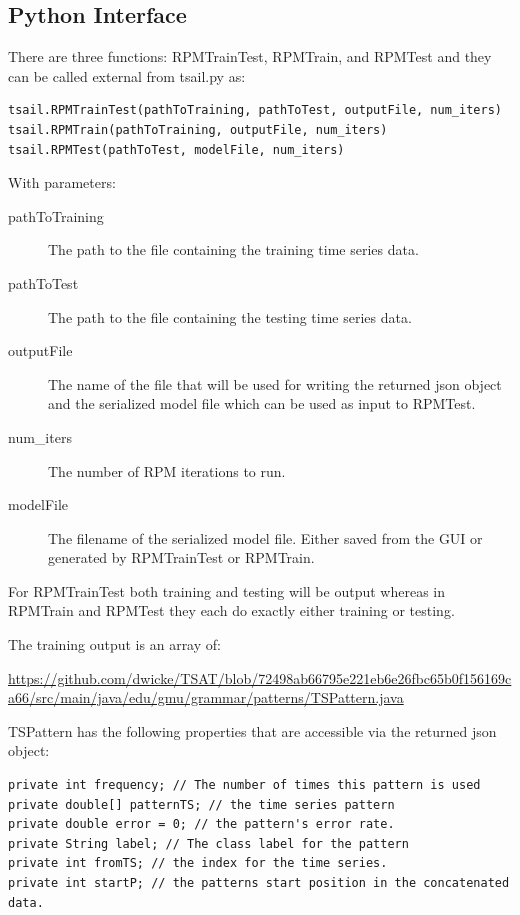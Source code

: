 \documentclass[titlepage, letterpaper, 12pt]{article}
\begin{document}
\subsection{Python Interface}
\label{pythonRPM}
There are three functions: RPMTrainTest, RPMTrain, and RPMTest and they can be called external from tsail.py as:

\begin{lstlisting}
tsail.RPMTrainTest(pathToTraining, pathToTest, outputFile, num_iters)
tsail.RPMTrain(pathToTraining, outputFile, num_iters)
tsail.RPMTest(pathToTest, modelFile, num_iters)
\end{lstlisting}

With parameters:
\begin{description}
	\item[pathToTraining] The path to the file containing the training time series data.
	\item[pathToTest] The path to the file containing the testing time series data.
	\item[outputFile] The name of the file that will be used for writing the returned json object and the serialized model file which can be used as input to RPMTest.
	\item[num\_iters] The number of RPM iterations to run.
	\item[modelFile]  The filename of the serialized model file.  Either saved from the GUI or generated by RPMTrainTest or RPMTrain.
\end{description}

For RPMTrainTest both training and testing will be output whereas in RPMTrain and RPMTest they each do exactly either training or testing. 

The training output is an array of:

\url{https://github.com/dwicke/TSAT/blob/72498ab66795e221eb6e26fbc65b0f156169ca66/src/main/java/edu/gmu/grammar/patterns/TSPattern.java}

TSPattern has the following properties that are accessible via the returned json object:

\begin{lstlisting}
private int frequency; // The number of times this pattern is used
private double[] patternTS; // the time series pattern
private double error = 0; // the pattern's error rate.
private String label; // The class label for the pattern
private int fromTS; // the index for the time series.
private int startP; // the patterns start position in the concatenated data.
\end{lstlisting}
\end{document}
